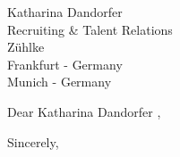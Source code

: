 \documentclass[10pt,letter]{letter}
\def\hm{Katharina Dandorfer } %
\begin{document}
    \begin{letter}{\hm \\ Recruiting & Talent Relations \\ Zühlke \\Frankfurt - Germany \\   Munich - Germany }
\opening{Dear \hm,}

\setlength\parindent{.5in}



 

\closing{Sincerely,}
\end{letter}
\end{document}
